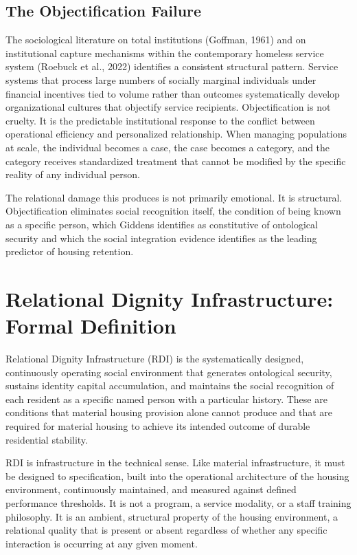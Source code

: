 \documentclass[12pt, letterpaper]{article}
\begin{document}
\subsection{The Objectification Failure}

The sociological literature on total institutions (Goffman, 1961) and on institutional capture mechanisms within the contemporary homeless service system (Roebuck et al., 2022) identifies a consistent structural pattern. Service systems that process large numbers of socially marginal individuals under financial incentives tied to volume rather than outcomes systematically develop organizational cultures that objectify service recipients. Objectification is not cruelty. It is the predictable institutional response to the conflict between operational efficiency and personalized relationship. When managing populations at scale, the individual becomes a case, the case becomes a category, and the category receives standardized treatment that cannot be modified by the specific reality of any individual person.

The relational damage this produces is not primarily emotional. It is structural. Objectification eliminates social recognition itself, the condition of being known as a specific person, which Giddens identifies as constitutive of ontological security and which the social integration evidence identifies as the leading predictor of housing retention.

\clearpage
\section{Relational Dignity Infrastructure: Formal Definition}

Relational Dignity Infrastructure (RDI) is the systematically designed, continuously operating social environment that generates ontological security, sustains identity capital accumulation, and maintains the social recognition of each resident as a specific named person with a particular history. These are conditions that material housing provision alone cannot produce and that are required for material housing to achieve its intended outcome of durable residential stability.

RDI is infrastructure in the technical sense. Like material infrastructure, it must be designed to specification, built into the operational architecture of the housing environment, continuously maintained, and measured against defined performance thresholds. It is not a program, a service modality, or a staff training philosophy. It is an ambient, structural property of the housing environment, a relational quality that is present or absent regardless of whether any specific interaction is occurring at any given moment.
\end{document}
